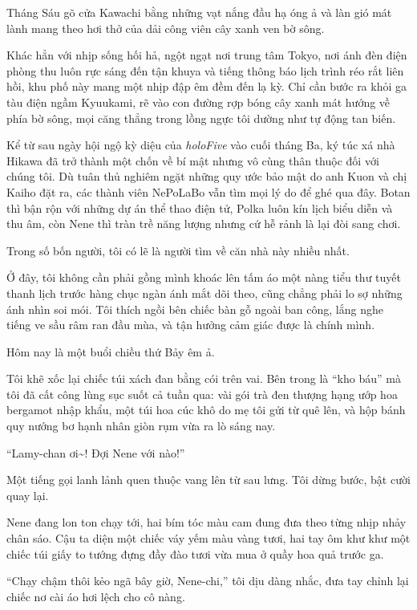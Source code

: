 \documentclass[../main.tex]{subfiles}
\begin{document}

Tháng Sáu gõ cửa Kawachi bằng những vạt nắng đầu hạ óng ả và làn gió mát lành mang theo hơi thở của dải công viên cây xanh ven bờ sông.

Khác hẳn với nhịp sống hối hả, ngột ngạt nơi trung tâm Tokyo, nơi ánh đèn điện phòng thu luôn rực sáng đến tận khuya và tiếng thông báo lịch trình réo rắt liên hồi, khu phố này mang một nhịp đập êm đềm đến lạ kỳ. Chỉ cần bước ra khỏi ga tàu điện ngầm Kyuukami, rẽ vào con đường rợp bóng cây xanh mát hướng về phía bờ sông, mọi căng thẳng trong lồng ngực tôi dường như tự động tan biến.

Kể từ sau ngày hội ngộ kỳ diệu của \textit{holoFive} vào cuối tháng Ba, ký túc xá nhà Hikawa đã trở thành một chốn về bí mật nhưng vô cùng thân thuộc đối với chúng tôi. Dù tuân thủ nghiêm ngặt những quy ước bảo mật do anh Kuon và chị Kaiho đặt ra, các thành viên NePoLaBo vẫn tìm mọi lý do để ghé qua đây. Botan thì bận rộn với những dự án thể thao điện tử, Polka luôn kín lịch biểu diễn và thu âm, còn Nene thì tràn trề năng lượng nhưng cứ hễ rảnh là lại đòi sang chơi.

Trong số bốn người, tôi có lẽ là người tìm về căn nhà này nhiều nhất.

Ở đây, tôi không cần phải gồng mình khoác lên tấm áo một nàng tiểu thư tuyết thanh lịch trước hàng chục ngàn ánh mắt dõi theo, cũng chẳng phải lo sợ những ánh nhìn soi mói. Tôi thích ngồi bên chiếc bàn gỗ ngoài ban công, lắng nghe tiếng ve sầu râm ran đầu mùa, và tận hưởng cảm giác được là chính mình.

Hôm nay là một buổi chiều thứ Bảy êm ả.

Tôi khẽ xốc lại chiếc túi xách đan bằng cói trên vai. Bên trong là ``kho báu'' mà tôi đã cất công lùng sục suốt cả tuần qua: vài gói trà đen thượng hạng ướp hoa bergamot nhập khẩu, một túi hoa cúc khô do mẹ tôi gửi từ quê lên, và hộp bánh quy nướng bơ hạnh nhân giòn rụm vừa ra lò sáng nay.

``Lamy-chan ơi\~{}! Đợi Nene với nào!''

Một tiếng gọi lanh lảnh quen thuộc vang lên từ sau lưng. Tôi dừng bước, bật cười quay lại.

Nene đang lon ton chạy tới, hai bím tóc màu cam đung đưa theo từng nhịp nhảy chân sáo. Cậu ta diện một chiếc váy yếm màu vàng tươi, hai tay ôm khư khư một chiếc túi giấy to tướng đựng đầy đào tươi vừa mua ở quầy hoa quả trước ga.

``Chạy chậm thôi kẻo ngã bây giờ, Nene-chi,'' tôi dịu dàng nhắc, đưa tay chỉnh lại chiếc nơ cài áo hơi lệch cho cô nàng.
\end{document}
